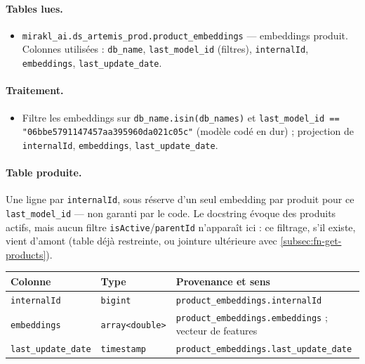 \documentclass[11pt,a4paper]{article}
\newcommand{\code}[1]{\texttt{\small #1}}
\begin{document}
\paragraph{Tables lues.}
\begin{itemize}[nosep,leftmargin=*]
  \item \code{mirakl\_ai.ds\_artemis\_prod.product\_embeddings} --- embeddings
        produit. Colonnes utilisées : \code{db\_name}, \code{last\_model\_id}
        (filtres), \code{internalId}, \code{embeddings}, \code{last\_update\_date}.
\end{itemize}

\paragraph{Traitement.}
\begin{itemize}[nosep,leftmargin=*]
  \item Filtre les embeddings sur \code{db\_name.isin(db\_names)} et
        \code{last\_model\_id == "06bbe5791147457aa395960da021c05c"} (modèle
        codé en dur) ; projection de \code{internalId}, \code{embeddings},
        \code{last\_update\_date}.
\end{itemize}

\paragraph{Table produite.}
Une ligne par \code{internalId}, sous réserve d'un seul embedding par produit pour ce
\code{last\_model\_id} --- non garanti par le code. Le docstring évoque des produits
actifs, mais aucun filtre \code{isActive}/\code{parentId} n'apparaît ici : ce
filtrage, s'il existe, vient d'amont (table déjà restreinte, ou jointure ultérieure
avec \ref{subsec:fn-get-products}).
\begin{center}
\small
\begin{tabular}{@{}llp{6.8cm}@{}}
\toprule
\textbf{Colonne} & \textbf{Type} & \textbf{Provenance et sens} \\
\midrule
\code{internalId} & \code{bigint} & \code{product\_embeddings.internalId} \\
\code{embeddings} & \code{array<double>} & \code{product\_embeddings.embeddings} ; vecteur de features \\
\code{last\_update\_date} & \code{timestamp} & \code{product\_embeddings.last\_update\_date} \\
\bottomrule
\end{tabular}
\end{center}
\end{document}
